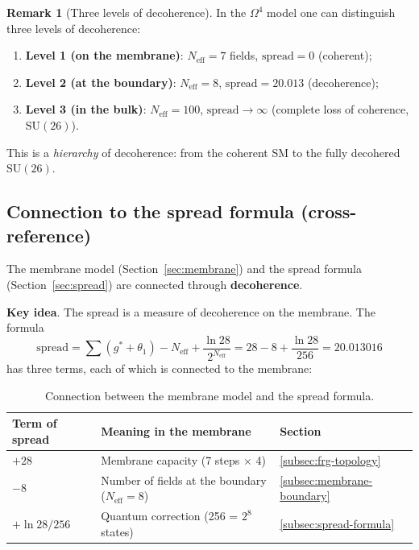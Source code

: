 \documentclass[11pt,a4paper]{article}
\newcommand{\SU}{\ensuremath{\mathrm{SU}}}
\newcommand{\Om}{\ensuremath{\Omega^4}}
\theoremstyle{definition}
\newtheorem{remark}[theorem]{Remark}
\begin{document}
\begin{remark}[Three levels of decoherence]
\label{rem:three-levels-decoherence}
In the $\Om$ model one can distinguish three levels of decoherence:
\begin{enumerate}
    \item \textbf{Level 1 (on the membrane)}:
          $N_{\text{eff}} = 7$ fields,
          $\text{spread} = 0$ (coherent);
    \item \textbf{Level 2 (at the boundary)}:
          $N_{\text{eff}} = 8$,
          $\text{spread} = 20.013$ (decoherence);
    \item \textbf{Level 3 (in the bulk)}:
          $N_{\text{eff}} = 100$,
          $\text{spread} \to \infty$ (complete loss
          of coherence, $\SU(26)$).
\end{enumerate}
This is a \emph{hierarchy} of decoherence: from the coherent
SM to the fully decohered $\SU(26)$.
\end{remark}

\subsection{Connection to the spread formula (cross-reference)}
\label{subsec:membrane-spread-link}

The membrane model (Section~\ref{sec:membrane}) and the spread formula
(Section~\ref{sec:spread}) are connected through \textbf{decoherence}.

\medskip\noindent
\textbf{Key idea}. The spread is a measure of decoherence
on the membrane. The formula
\begin{equation}
    \text{spread} = \sum(g^*+\theta_1) - N_{\text{eff}}
    + \frac{\ln 28}{2^{N_{\text{eff}}}}
    = 28 - 8 + \frac{\ln 28}{256}
    = 20.013016
\end{equation}
has three terms, each of which is connected to the membrane:

\begin{table}[ht]
\centering
\caption{Connection between the membrane model and the spread formula.}
\label{tab:membrane-spread-link}
\begin{tabular}{lll}
\toprule
Term of spread & Meaning in the membrane & Section \\
\midrule
$+28$ & Membrane capacity (7 steps $\times$ 4) &
    \ref{subsec:frg-topology} \\
$-8$  & Number of fields at the boundary ($N_{\text{eff}} = 8$) &
    \ref{subsec:membrane-boundary} \\
$+\ln 28 / 256$ & Quantum correction (256 = $2^8$ states) &
    \ref{subsec:spread-formula} \\
\bottomrule
\end{tabular}
\end{table}
\end{document}
